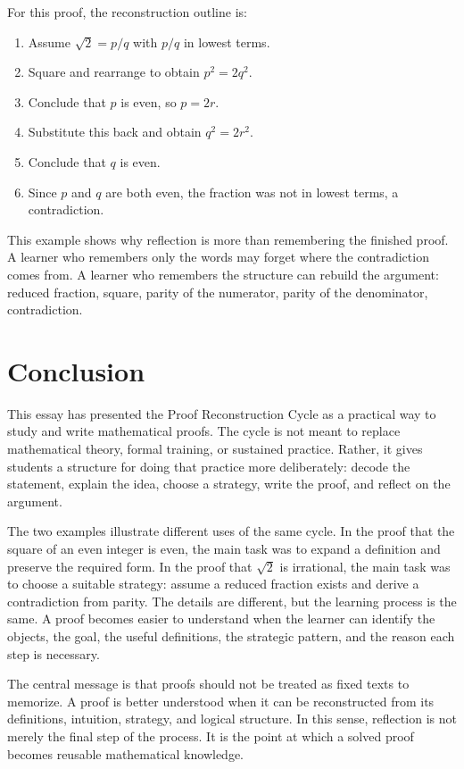 \documentclass[11pt,a4paper]{article}
\begin{document}
For this proof, the reconstruction outline is:

\begin{enumerate}[label=\arabic*., leftmargin=*]
    \item Assume \(\sqrt{2} = p/q\) with \(p/q\) in lowest terms.
    \item Square and rearrange to obtain \(p^2 = 2q^2\).
    \item Conclude that \(p\) is even, so \(p = 2r\).
    \item Substitute this back and obtain \(q^2 = 2r^2\).
    \item Conclude that \(q\) is even.
    \item Since \(p\) and \(q\) are both even, the fraction was not in lowest terms, a contradiction.
\end{enumerate}

This example shows why reflection is more than remembering the finished proof. A learner who remembers only the words may forget where the contradiction comes from. A learner who remembers the structure can rebuild the argument: reduced fraction, square, parity of the numerator, parity of the denominator, contradiction.

\section{Conclusion}

This essay has presented the Proof Reconstruction Cycle as a practical way to study and write mathematical proofs. The cycle is not meant to replace mathematical theory, formal training, or sustained practice. Rather, it gives students a structure for doing that practice more deliberately: decode the statement, explain the idea, choose a strategy, write the proof, and reflect on the argument.

The two examples illustrate different uses of the same cycle. In the proof that the square of an even integer is even, the main task was to expand a definition and preserve the required form. In the proof that \(\sqrt{2}\) is irrational, the main task was to choose a suitable strategy: assume a reduced fraction exists and derive a contradiction from parity. The details are different, but the learning process is the same. A proof becomes easier to understand when the learner can identify the objects, the goal, the useful definitions, the strategic pattern, and the reason each step is necessary.

The central message is that proofs should not be treated as fixed texts to memorize. A proof is better understood when it can be reconstructed from its definitions, intuition, strategy, and logical structure. In this sense, reflection is not merely the final step of the process. It is the point at which a solved proof becomes reusable mathematical knowledge.



\end{document}
